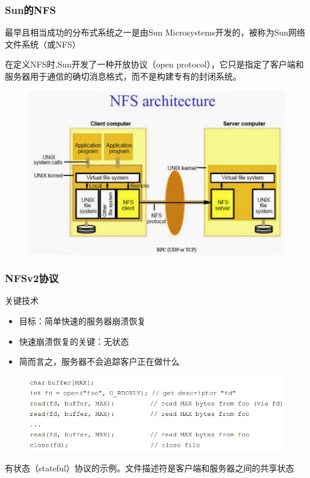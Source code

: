 \begin{frame}[fragile]
    \frametitle{Sun的NFS}
    最早且相当成功的分布式系统之一是由Sun Microsystems开发的，被称为Sun网络文件系统（或NFS）
    
    在定义NFS时,Sun开发了一种开放协议（open protocol），它只是指定了客户端和服务器用于通信的确切消息格式，而不是构建专有的封闭系统。
        \begin{figure}
            \includegraphics[width=0.5\linewidth]{figs/sun-nfs.png}
        \end{figure}
\end{frame}
\begin{frame}[fragile]
    \frametitle{NFSv2协议}
关键技术
    \begin{itemize}
        \item 目标：简单快速的服务器崩溃恢复
        \item 快速崩溃恢复的关键：无状态
        \item 简而言之，服务器不会追踪客户正在做什么
    \end{itemize}
    \begin{figure}
    \includegraphics[width=0.8\linewidth]{figs/stateful-code.png}
    \end{figure}
有状态（stateful）协议的示例。文件描述符是客户端和服务器之间的共享状态 
\end{frame}

